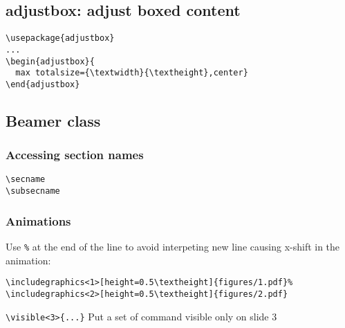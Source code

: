 \subsection{adjustbox: adjust boxed content}
\begin{verbatim}
\usepackage{adjustbox}
...
\begin{adjustbox}{
  max totalsize={\textwidth}{\textheight},center}
\end{adjustbox}
\end{verbatim}

\subsection{Beamer class}
\subsubsection{Accessing section names}
\verb |\secname|\\
\verb |\subsecname|\\
\subsubsection{Animations}
Use \verb|%| at the end of the line to avoid interpeting new line causing x-shift in the animation:
\begin{verbatim}
\includegraphics<1>[height=0.5\textheight]{figures/1.pdf}%
\includegraphics<2>[height=0.5\textheight]{figures/2.pdf}
\end{verbatim}
\verb|\visible<3>{...}| Put a set of command visible only on slide 3
